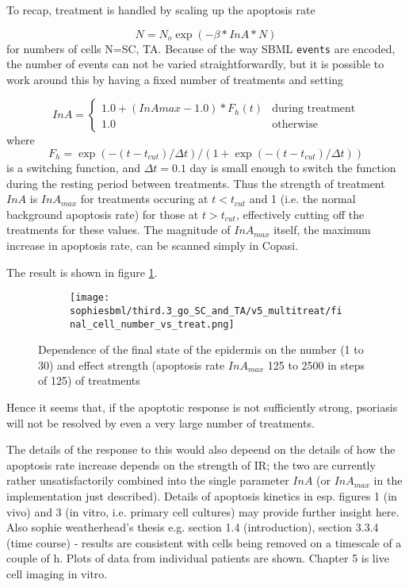 \documentclass[a4paper,10pt]{report}
\newcommand{\psortbase}{/home/ngrs2/work/bsu/PSORT_Zuliani_Reynolds/}
\newcommand{\sbmlbase}{\psortbase/sbml-sh/}
\newcommand{\sophiesbml}{\sbmlbase/sophie_like}
\begin{document}
To recap, treatment is handled by scaling up the apoptosis rate 

\[
N = N_o \exp(-\beta * InA * N)
\]
for numbers of cells N={SC, TA}. 
Because of the way SBML {\tt events} are encoded, the number of events can not
be varied straightforwardly, but 
it is possible to work around this by having a fixed number of treatments
and setting 

\[
 InA = \left\{ \begin{array}{ll}
1.0 + (InAmax-1.0)*F_h(t) &\mbox{during treatment}\\
1.0 &\mbox{otherwise}
\end{array} \right. 
\]
where 
\[
F_h=\exp(-(t-t_{cut})/\Delta t)/(1+\exp(-(t-t_{cut})/\Delta t))
\]
is a switching function, and $\Delta t=0.1$ day is small enough to switch the function during the resting period between treatments. Thus the strength of treatment $InA$ is $InA_{max}$ for treatments occuring at $t<t_{cut}$ and 1 (i.e. the normal background apoptosis rate) for those at $t>t_{cut}$, effectively cutting off the treatments for these values.  The magnitude of $InA_{max}$ itself, the maximum increase in apoptosis rate, can be scanned simply in Copasi. 

The result is shown in figure \ref{fig:thirdpoint3sophie_scan_treat}.

\begin{figure}[h!]
  \begin{subfigure}{\textwidth}
    \centering
    \texttt{[image: \\sophiesbml/third.3\_go\_SC\_and\_TA/v5\_multitreat/final\_cell\_number\_vs\_treat.png]}
  \end{subfigure}
  \caption{Dependence of the final state of the epidermis on the number (1 to 30) and effect strength (apoptosis rate $InA_{max}$ 125 to 2500 in steps of 125) of treatments}
  \label{fig:thirdpoint3sophie_scan_treat}
\end{figure}

Hence it seems that, if the apoptotic response is not sufficiently strong, psoriasis will not be resolved by even a very large number of treatments. 

The details of the response to this would also depeend on the details of how the apoptosis rate increase depends on the strength of IR; the two are currently rather unsatisfactorily combined into the single parameter $InA$ (or $InA_{max}$ in the implementation just described). Details of apoptosis kinetics in \cite{weatherhead2011keratinocyte} esp. figures 1 (in vivo) and 3 (in vitro, i.e. primary cell cultures) may provide further insight here. Also sophie weatherhead's thesis e.g. section 1.4 (introduction), section 3.3.4 (time course) - results are consistent with cells being removed on a timescale of a couple of h. Plots of data from individual patients are shown. Chapter 5 is live cell imaging in vitro.
\end{document}
